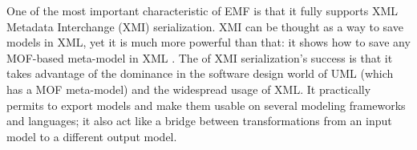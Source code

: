 One of the most important characteristic of EMF is that it fully supports XML Metadata Interchange (XMI) serialization. XMI can be thought as a way to save models in XML, yet it is much more powerful than that: it shows how to save any MOF-based meta-model in XML \cite{XMIandMOF}. The of XMI serialization's success is that it takes advantage of the dominance in the software design world of UML (which has a MOF meta-model) and the widespread usage of XML. It practically permits to export models and make them usable on several modeling frameworks and languages; it also act like a bridge between transformations from an input model to a different output model.




   

% 


% 


 
